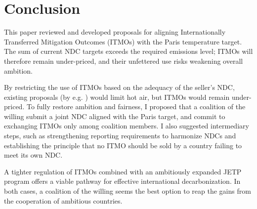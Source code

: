 \documentclass[12pt,english]{article}
\begin{document}
\section{Conclusion\label{sec:conclusion}}

This paper reviewed and developed proposals for aligning Internationally Transferred Mitigation Outcomes (ITMOs) with the Paris temperature target. The sum of current NDC targets exceeds the required emissions level; ITMOs will therefore remain under-priced, and their unfettered use risks weakening overall ambition.

By restricting the use of ITMOs based on the adequacy of the seller's NDC, existing proposals (by e.g. \citealp{michaelowa_additionality_2019}) would limit hot air, but ITMOs would remain under-priced. To fully restore ambition and fairness, I proposed that a coalition of the willing submit a joint NDC aligned with the Paris target, and commit to exchanging ITMOs only among coalition members. I also suggested intermediary steps, such as strengthening reporting requirements to harmonize NDCs and establishing the principle that no ITMO should be sold by a country failing to meet its own NDC.

A tighter regulation of ITMOs combined with an ambitiously expanded JETP program \citep{steckel_climate_2017,bolton_why_2025} offers a viable pathway for effective international decarbonization. In both cases, a coalition of the willing seems the best option to reap the gains from the cooperation of ambitious countries. 



\end{document}
